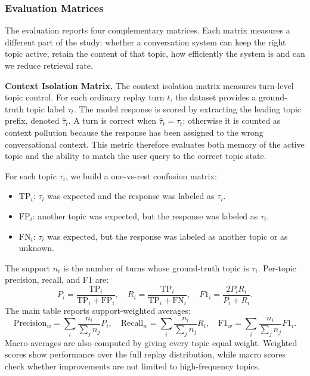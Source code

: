 \documentclass[pdflatex,sn-mathphys-num]{sn-jnl}%
\theoremstyle{thmstyleone}%
\theoremstyle{thmstyletwo}%
\theoremstyle{thmstylethree}%
\begin{document}
\subsubsection{Evaluation Matrices}\label{subsubsec:metrics}

The evaluation reports four complementary matrices. Each matrix measures a different part of the study: whether a conversation system can keep the right topic active, retain the content of that topic, how  efficiently the system is and can we reduce retrieval rate.

\textbf{Context Isolation Matrix.}
The context isolation matrix measures turn-level topic control. For each ordinary replay turn $t$, the dataset provides a ground-truth topic label $\tau_t$. The model response is scored by extracting the leading topic prefix, denoted $\hat{\tau}_t$. A turn is correct when $\hat{\tau}_t=\tau_t$; otherwise it is counted as context pollution because the response has been assigned to the wrong conversational context. This metric therefore evaluates both memory of the active topic and the ability to match the user query to the correct topic state.

For each topic $\tau_i$, we build a one-vs-rest confusion matrix:
\begin{itemize}
    \item $\text{TP}_i$: $\tau_i$ was expected and the response was labeled as $\tau_i$.
    \item $\text{FP}_i$: another topic was expected, but the response was labeled as $\tau_i$.
    \item $\text{FN}_i$: $\tau_i$ was expected, but the response was labeled as another topic or as unknown.
\end{itemize}
The support $n_i$ is the number of turns whose ground-truth topic is $\tau_i$. Per-topic precision, recall, and F1 are:
\begin{equation}
P_i = \frac{\text{TP}_i}{\text{TP}_i + \text{FP}_i}, \quad
R_i = \frac{\text{TP}_i}{\text{TP}_i + \text{FN}_i}, \quad
F1_i = \frac{2P_iR_i}{P_i + R_i}.
\label{eq:per_topic_metrics}
\end{equation}
The main table reports support-weighted averages:
\begin{equation}
\text{Precision}_w = \sum_i \frac{n_i}{\sum_j n_j} P_i, \quad
\text{Recall}_w = \sum_i \frac{n_i}{\sum_j n_j} R_i, \quad
\text{F1}_w = \sum_i \frac{n_i}{\sum_j n_j} F1_i.
\label{eq:weighted_isolation}
\end{equation}
Macro averages are also computed by giving every topic equal weight. Weighted scores show performance over the full replay distribution, while macro scores check whether improvements are not limited to high-frequency topics.
\end{document}
